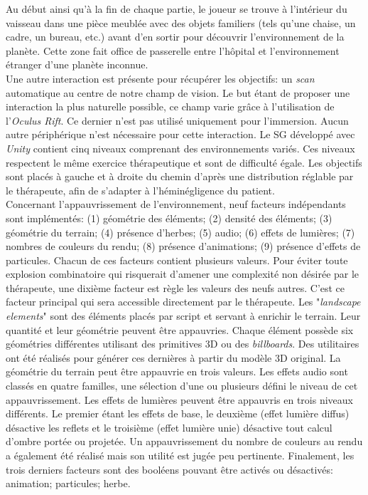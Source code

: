 Au début ainsi qu'à la fin de chaque partie, le joueur se trouve à l'intérieur du vaisseau dans une pièce meublée avec des objets familiers (tels qu'une chaise, un cadre, un bureau, etc.) avant d'en sortir pour découvrir l'environnement de la planète. Cette zone fait office de passerelle entre l'hôpital et l'environnement étranger d'une planète inconnue.
\\

Une autre interaction est présente pour récupérer les objectifs: un \textit{scan} automatique au centre de notre champ de vision. Le but étant de proposer une interaction la plus naturelle possible, ce champ varie grâce à l'utilisation de l'\textit{Oculus Rift}. Ce dernier n'est pas utilisé uniquement pour l'immersion. Aucun autre périphérique n'est nécessaire pour cette interaction. Le SG développé avec \textit{Unity} contient cinq niveaux comprenant des environnements variés. Ces niveaux respectent le même exercice thérapeutique et sont de difficulté égale. Les objectifs sont placés à gauche et à droite du chemin d'après une distribution réglable par le thérapeute, afin de s'adapter à l'héminégligence du patient.
\\

Concernant l'appauvrissement de l'environnement, neuf facteurs indépendants sont implémentés: (1) géométrie des éléments; (2) densité des éléments; (3) géométrie du terrain; (4) présence d'herbes; (5) audio; (6) effets de lumières; (7) nombres de couleurs du rendu; (8) présence d'animations; (9) présence d'effets de particules. Chacun de ces facteurs contient plusieurs valeurs. Pour éviter toute explosion combinatoire qui risquerait d'amener une complexité non désirée par le thérapeute, une dixième facteur est règle les valeurs des neufs autres. C'est ce facteur principal qui sera accessible directement par le thérapeute. Les "\textit{landscape elements}" sont des éléments placés par script et servant à enrichir le terrain. Leur quantité et leur géométrie peuvent être appauvries. Chaque élément possède six géométries différentes utilisant des primitives 3D ou des \textit{billboards}. Des utilitaires ont été réalisés pour générer ces dernières à partir du modèle 3D original. La géométrie du terrain peut être appauvrie en trois valeurs. Les effets audio sont classés en quatre familles, une sélection d'une ou plusieurs défini le niveau de cet appauvrissement. Les effets de lumières peuvent être appauvris en trois niveaux différents. Le premier étant les effets de base, le deuxième (effet lumière diffus) désactive les reflets et le troisième (effet lumière unie) désactive tout calcul d'ombre portée ou projetée. Un appauvrissement du nombre de couleurs au rendu a également été réalisé mais son utilité est jugée peu pertinente. Finalement, les trois derniers facteurs sont des booléens pouvant être activés ou désactivés: animation; particules; herbe.
\\

